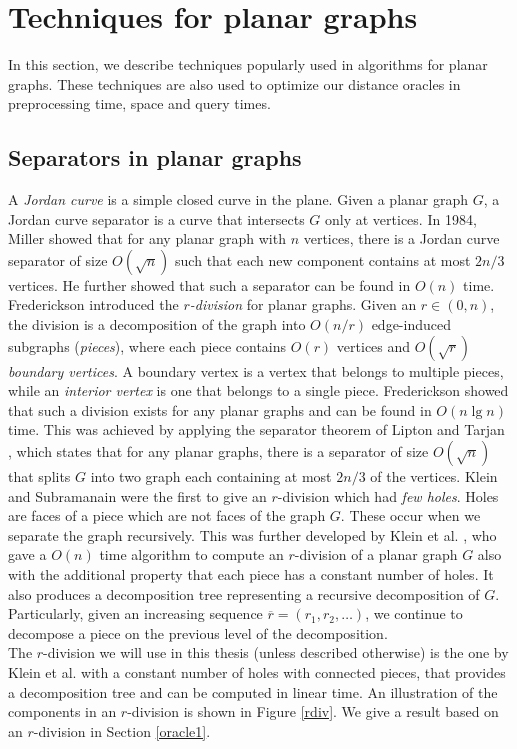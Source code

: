 \section{Techniques for planar graphs}\label{techniques}
In this section, we describe techniques popularly used in algorithms for planar graphs.
These techniques are also used to optimize our distance oracles in preprocessing time, space and
query times.

\subsection{Separators in planar graphs}\label{rdiv2}
A \textit{Jordan curve} is a simple closed curve in the plane. Given a planar graph $G$,
a Jordan curve separator is a curve that intersects $G$ only at vertices. In 1984, Miller
\cite{miller1984finding} showed that for any planar graph with $n$ vertices, there is a Jordan curve
separator of size $O(\sqrt{n})$ such that each new component contains at most $2n/3$
vertices. He further showed that such a separator can be found in $O(n)$ time. \\
Frederickson \cite{frederickson1987fast} introduced the \textit{$r$-division} for planar
graphs. Given an $r\in (0,n)$, the division is a decomposition of the graph into
$O(n/r)$ edge-induced subgraphs (\textit{pieces}), where each piece contains $O(r)$ vertices and $O(\sqrt{r})$ \textit{boundary vertices}. A
boundary vertex is a vertex that belongs to multiple pieces, while an \textit{interior
vertex} is one that belongs to a single piece. Frederickson showed that
such a division exists for any planar graphs and can be found in $O(n\lg n)$ time. This
was achieved by applying the separator theorem of Lipton and Tarjan
\cite{lipton1979separator}, which states that for any planar graphs, there is a separator
of size $O(\sqrt{n})$ that splits $G$ into two graph each containing at most $2n/3$ of
the vertices. Klein and Subramanain \cite{klein1998fully} were the first to give an
$r$-division which had \textit{few holes}. Holes are faces of a piece which are not faces
of the graph $G$. These occur when we separate the graph recursively. This was further developed
by Klein et al. \cite{klein2013structured}, who gave a $O(n)$ time algorithm to compute
an $r$-division of a planar graph $G$ also with the additional property that each piece has a
constant number of holes. It also produces a decomposition tree representing a recursive
decomposition of $G$. Particularly, given an increasing sequence $\overline{r}=(r_1,r_2,\dots)$, we
continue to decompose a piece on the previous level of the decomposition.
\\
The $r$-division we will use in this thesis (unless described otherwise) is the one by Klein et al.
\cite{klein2013structured} with a constant number of
holes with connected pieces, that provides a decomposition tree and can be computed in linear time. An
illustration of the components in an $r$-division is shown in Figure \ref{rdiv}. We give
a result based on an $r$-division in Section \ref{oracle1}.

